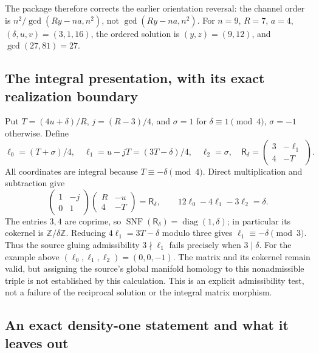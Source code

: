 The package therefore corrects the earlier orientation reversal: the channel
order is $n^2/\gcd(Ry-na,n^2)$, not $\gcd(Ry-na,n^2)$.
For $n=9$, $R=7$, $a=4$, $(\delta,u,v)=(3,1,16)$, the ordered
solution is $(y,z)=(9,12)$, and $\gcd(27,81)=27$.

\subsection{The integral presentation, with its exact realization boundary}

Put $T=(4u+\delta)/R$, $j=(R-3)/4$, and
$\sigma=1$ for $\delta\equiv1\pmod4$, $\sigma=-1$ otherwise. Define
\[
 \ell_0=(T+\sigma)/4,\quad \ell_1=u-jT=(3T-\delta)/4,
 \quad \ell_2=\sigma,\quad
 \mathsf R_\delta=\begin{pmatrix}3&-\ell_1\\4&-T\end{pmatrix}.
\]
All coordinates are integral because $T\equiv-\delta\pmod4$.
Direct multiplication and subtraction give
\[
 \begin{pmatrix}1&-j\\0&1\end{pmatrix}
 \begin{pmatrix}R&-u\\4&-T\end{pmatrix}=\mathsf R_\delta,
 \qquad12\ell_0-4\ell_1-3\ell_2=\delta.
\]
The entries $3,4$ are coprime, so
$\operatorname{SNF}(\mathsf R_\delta)=\operatorname{diag}(1,\delta)$;
in particular its cokernel is $\mathbb Z/\delta\mathbb Z$.
Reducing $4\ell_1=3T-\delta$ modulo three gives
$\ell_1\equiv-\delta\pmod3$. Thus the source gluing admissibility
$3\nmid\ell_1$ fails precisely when $3\mid\delta$.
For the example above $(\ell_0,\ell_1,\ell_2)=(0,0,-1)$.
The matrix and its cokernel remain valid, but assigning the source's global
manifold homology to this nonadmissible triple is not established by this
calculation. This is an explicit admissibility test, not a failure of the
reciprocal solution or the integral matrix morphism.

\subsection{An exact density-one statement and what it leaves out}

